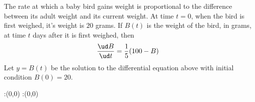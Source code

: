 \question The rate at which a baby bird gains weight is proportional to the difference 
between its adult weight and its current weight. At time $t=0$, when the bird is first
weighed, it's weight is $20$ grams. If $B(t)$ is the weight of the bird, in grams, at
time $t$ days after it is first weighed, then
\begin{align}
  \dfrac{\ud B}{\ud t} = \dfrac{1}{5}(100 - B) \nonumber
\end{align}
Let $y=B(t)$ be the solution to the differential equation above with initial condition
$B(0)=20$. 
\insertQR{}


\ifprintanswers
  \begin{marginfigure}
      :(0,0)
      :(0,0)
    \figdrawbegin{}
      \figdrawline [100,101]
    \figdrawend
    \figvisu{\figBoxA}{}{%
    }
    \centerline{\box\figBoxA}
  \end{marginfigure}
\fi 


